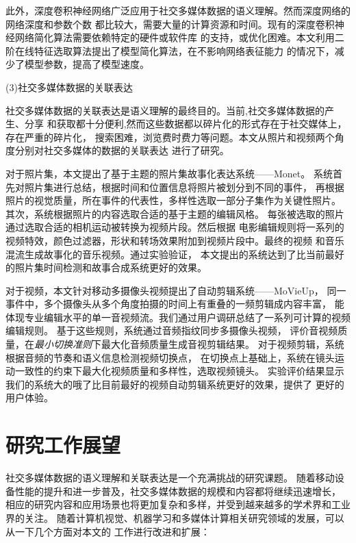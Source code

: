 此外，深度卷积神经网络广泛应用于社交多媒体数据的语义理解。然而深度网络的网络深度和参数个数
都比较大，需要大量的计算资源和时间。现有的深度卷积神经网络简化算法需要依赖特定的硬件或软件库
的支持，或优化困难。本文利用二阶在线特征选取算法提出了模型简化算法，在不影响网络表征能力
的情况下，减少了模型参数，提高了模型速度。

(3)社交多媒体数据的关联表达

社交多媒体数据的关联表达是语义理解的最终目的。当前,社交多媒体数据的产生、分享
和获取都十分便利,然而这些数据都以碎片化的形式存在于社交媒体上，存在严重的碎片化，
搜索困难，浏览费时费力等问题。本文从照片和视频两个角度分别对社交多媒体的数据的关联表达
进行了研究。

对于照片集，本文提出了基于主题的照片集故事化表达系统——Monet。
系统首先对照片集进行总结，根据时间和位置信息将照片被划分到不同的事件，
再根据照片的视觉质量，所在事件的代表性，多样性选取一部分子集作为关键性照片。
其次，系统根据照片的内容选取合适的基于主题的编辑风格。
每张被选取的照片通过选取合适的相机运动被转换为视频片段。然后根据
电影编辑规则将一系列的视频特效，颜色过滤器，形状和转场效果附加到视频片段中。最终的视频
和音乐混流生成故事化的音乐视频。通过实验验证，
本文提出的系统达到了比当前最好的照片集时间检测和故事合成系统更好的效果。

对于视频，本文针对移动多摄像头视频提出了自动剪辑系统——MoVieUp，
同一事件中，多个摄像头从多个角度拍摄的时间上有重叠的一频剪辑成内容丰富，
能体现专业编辑水平的单一音视频流。我们通过用户调研总结了一系列可计算的视频编辑规则。
基于这些规则，系统通过音频指纹同步多摄像头视频，
评价音视频质量，在\emph{最小切换准则}下最大化音频质量生成音视剪辑结果。
对于视频剪辑，系统根据音频的节奏和语义信息检测视频切换点，
在切换点上基础上，系统在镜头运动一致性的约束下最大化视频质量和多样性，选取视频镜头。
实验评价结果显示我们的系统大的哦了比目前最好的视频自动剪辑系统更好的效果，提供了
更好的用户体验。

\section{研究工作展望}
社交多媒体数据的语义理解和关联表达是一个充满挑战的研究课题。
随着移动设备性能的提升和进一步普及，社交多媒体数据的规模和内容都将继续迅速增长，
相应的研究内容和应用场景也将更加复杂和多样，并受到越来越多的学术界和工业界的关注。
随着计算机视觉、机器学习和多媒体计算相关研究领域的发展，可以从一下几个方面对本文的
工作进行改进和扩展：

